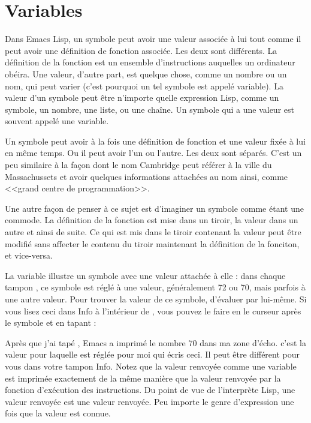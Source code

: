 \section{Variables}

Dans Emacs Lisp, un symbole peut avoir une valeur associée à lui tout
comme il peut avoir une définition de fonction associée. Les deux sont
différents. La définition de la fonction est un ensemble
d'instructions auquelles un ordinateur obéira. Une valeur, d'autre
part, est quelque chose, comme un nombre ou un nom, qui peut varier
(c'est pourquoi un tel symbole est appelé variable). La valeur d'un
symbole peut être n'importe quelle expression Lisp, comme un symbole,
un nombre, une liste, ou une chaîne. Un symbole qui a une valeur est
souvent appelé une variable. 

Un symbole peut avoir à la fois une définition de fonction et une
valeur fixée à lui en même temps. Ou il peut avoir l'un ou
l'autre. Les deux sont séparés. C'est un peu similaire à la façon dont
le nom Cambridge peut référer à la ville du Massachussets et avoir
quelques informations attachées au nom ainsi, comme <<grand centre de
programmation>>. 

Une autre façon de penser à ce sujet est d'imaginer un symbole comme
étant une commode. La définition de la fonction est mise dans un
tiroir, la valeur dans un autre et ainsi de suite. Ce qui est mis dans
le tiroir contenant la valeur peut être modifié sans affecter le
contenu du tiroir maintenant la définition de la fonciton, et
vice-versa. 

La variable  illustre un symbole avec une valeur
attachée à elle : dans chaque tampon \gem , ce symbole est réglé à une
valeur, généralement 72 ou 70, mais parfois à une autre valeur. Pour
trouver la valeur de ce symbole, d'évaluer par lui-même. Si vous lisez
ceci dans Info à l'intérieur de \gem , vous pouvez le faire en le
curseur après le symbole et en tapant  :
\begin{center}
\end{center}

Après que j'ai tapé , Emacs a imprimé le nombre 70
dans ma zone d'écho. c'est la valeur pour laquelle 
est réglée pour moi qui écris ceci. Il peut être différent pour vous
dans votre tampon Info. Notez que la valeur renvoyée comme une
variable est imprimée exactement de la même manière que la valeur
renvoyée par la fonction d'exécution des instructions. Du point de vue
de l'interprète Lisp, une valeur renvoyée est une valeur
renvoyée. Peu importe le genre d'expression une fois que la valeur est
connue.

